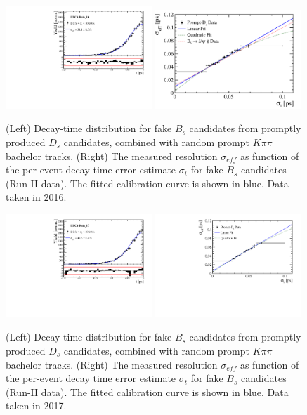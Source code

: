 \begin{figure}[h]
\centering
\includegraphics[height=!,width=0.49\textwidth]{figs/Resolution/SignalData_16_bin_all.pdf}
\includegraphics[height=!,width=0.49\textwidth]{figs/Resolution/ScaleFactor_Data_16.pdf}
\caption{ (Left) Decay-time distribution for fake $B_s$ candidates from promptly produced $D_s$ candidates, combined with random prompt $K\pi\pi$ bachelor tracks.
(Right) The measured resolution $\sigma_{eff}$ as function of the per-event decay time error estimate $\sigma_t$ for fake $B_s$ candidates (Run-II data).
The fitted calibration curve is shown in blue. Data taken in 2016.}
\label{fig:scaleFactorData_16}
\end{figure}

\begin{figure}[h]
\centering
\includegraphics[height=!,width=0.49\textwidth]{figs/Resolution/SignalData_17_bin_all.pdf}
\includegraphics[height=!,width=0.49\textwidth]{figs/Resolution/ScaleFactor_Data_17.pdf}
\caption{ (Left) Decay-time distribution for fake $B_s$ candidates from promptly produced $D_s$ candidates, combined with random prompt $K\pi\pi$ bachelor tracks.
(Right) The measured resolution $\sigma_{eff}$ as function of the per-event decay time error estimate $\sigma_t$ for fake $B_s$ candidates (Run-II data).
The fitted calibration curve is shown in blue. Data taken in 2017.}
\label{fig:scaleFactorData_17}
\end{figure}

